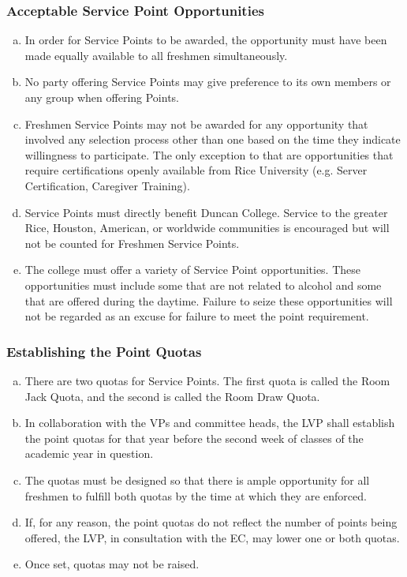 \documentclass[USletter,12pt]{article}
\begin{document}
\subsubsection{Acceptable Service Point Opportunities}
\begin{enumerate}[(a)]
\item In order for Service Points to be awarded, the opportunity must have been made equally available to all freshmen simultaneously.
\item No party offering Service Points may give preference to its own members or any group when offering Points.
\item Freshmen Service Points may not be awarded for any opportunity that involved any selection process other than one based on the time they indicate willingness to participate.  The only exception to that are opportunities that require certifications openly available from Rice University (e.g. Server Certification, Caregiver Training). 
\item Service Points must directly benefit Duncan College. Service to the greater Rice, Houston, American, or worldwide communities is encouraged but will not be counted for Freshmen Service Points.
\item The college must offer a variety of Service Point opportunities. These opportunities must include some that are not related to alcohol and some that are offered during the daytime. Failure to seize these opportunities will not be regarded as an excuse for failure to meet the point requirement.
\end{enumerate}

\subsubsection{Establishing the Point Quotas}
\begin{enumerate}[(a)]
\item There are two quotas for Service Points.  The first quota is called the Room Jack Quota, and the second is called the Room Draw Quota.
\item In collaboration with the VPs and committee heads, the LVP shall establish the point quotas for that year before the second week of classes of the academic year in question.
\item The quotas must be designed so that there is ample opportunity for all freshmen to fulfill both quotas by the time at which they are enforced.
\item If, for any reason, the point quotas do not reflect the number of points being offered, the LVP, in consultation with the EC, may lower one or both quotas.
\item Once set, quotas may not be raised.
\end{enumerate}
\end{document}
